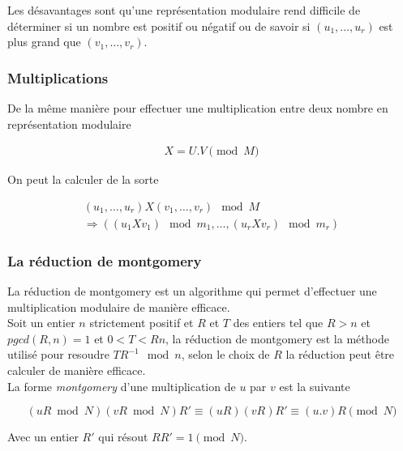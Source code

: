 \documentclass[letterpaper]{article}
\begin{document}
Les désavantages sont qu'une représentation modulaire rend difficile de
déterminer si un nombre est positif ou négatif ou de savoir si
$(u_1, \dots, u_r)$ est plus grand que $(v_1, \dots, v_r)$.

\subsubsection{Multiplications}

De la même manière pour effectuer une multiplication entre deux nombre en
représentation modulaire

\begin{equation}
  \begin{split}
    X = U.V \pmod M
  \end{split}
\end{equation}

On peut la calculer de la sorte

\begin{equation}
  \begin{split}
    (u_1, \dots, u_r) X (v_1, \dots, v_r) \mod M \\
      \Rightarrow ((u_1 X v_1) \mod m_1, \dots, (u_r X v_r) \mod m_r)
  \end{split}
\end{equation}

\subsubsection{La réduction de montgomery}

La réduction de montgomery est un algorithme qui permet d'effectuer une
multiplication modulaire de manière efficace\cite{menezes1996crypto}.\\

Soit un entier $n$ strictement positif et $R$ et $T$ des entiers tel que $R >
n$ et $pgcd(R, n) = 1$ et $0 < T < Rn$, la réduction de montgomery est la
méthode utilisé pour resoudre $T R^{-1} \mod n$, selon le choix de $R$ la
réduction peut être calculer de manière efficace\cite{menezes1996crypto}.\\

La forme \emph{montgomery} d'une multiplication de $u$ par $v$ est la
suivante

$$(uR \bmod N)(vR \bmod N) R' ≡ (uR)(vR) R' ≡ (u.v) R \pmod N$$

Avec un entier $R'$ qui résout $RR' = 1 \pmod N$.\\
\end{document}
